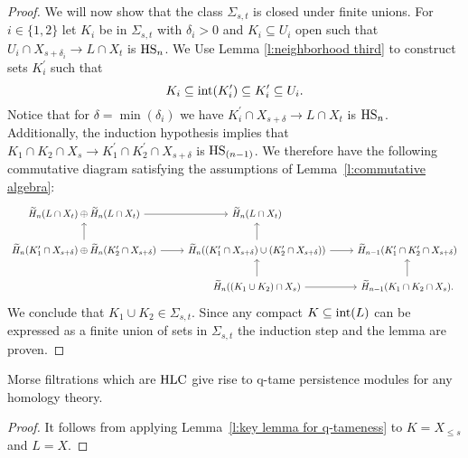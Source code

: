 \begin{proof}
	We will now show that the class $\Sigma_{s,t}$ is closed under finite unions.
	For $i \in \{1, 2\}$ let $K_i$ be in $\Sigma_{s,t}$ with $\delta_i > 0$ and $K_i \subseteq U_i$ open such that $U_{i} \cap X_{s+\delta_i} \to L \cap X_{t}$ is $\mathrm{HS}_n$.
	We Use Lemma \ref{l:neighborhood third} to construct sets $K_i^\prime$ such that
	\begin{equation*}
	K_i \subseteq \operatorname{int}(K_i^\prime) \subseteq K_i^\prime \subseteq U_i.
	\end{equation*}
	Notice that for $\delta = \min(\delta_i)$ we have $K_i^\prime \cap X_{s+\delta} \to L \cap X_t$ is $\mathrm{HS}_n$.
	Additionally, the induction hypothesis implies that $K_1 \cap K_2 \cap X_s \to K_1^\prime \cap K_2^\prime \cap X_{s+\delta}$ is $\mathrm{HS}_{(n-1)}$.
	We therefore have the following commutative diagram satisfying the assumptions of Lemma~\ref{l:commutative algebra}:
	\begin{equation*}
	\begin{tikzcd}
	\H_n(L \cap X_t) \oplus \H_n(L \cap X_t) \arrow[r] &
	\H_n(L \cap X_t) & \\
	\H_{n}(K_1^\prime \cap X_{s+\delta}) \oplus \H_n(K_2^\prime \cap X_{s+\delta}) \arrow[r] \arrow[u] & 
	\H_{n}((K_1^\prime \cap X_{s+\delta}) \cup (K_2^\prime \cap X_{s+\delta})) \arrow[r] \arrow[u] &
	\H_{n-1}(K_1^\prime \cap K_2^\prime \cap X_{s+\delta}) \\ & 
	\H_{n}((K_1 \cup K_2) \cap X_s) \arrow[r] \arrow[u] &
	\H_{n-1}(K_1 \cap K_2 \cap X_s). \arrow[u]
	\end{tikzcd}
	\end{equation*}
	We conclude that $K_1 \cup K_2 \in \Sigma_{s, t}$.
	Since any compact $K \subseteq \operatorname{int}(L)$ can be expressed as a finite union of sets in $\Sigma_{s,t}$ the induction step and the lemma are proven.
\end{proof}

\begin{thm} \label{t:strong local connectenss implies q-tameness}
	Morse filtrations which are $\mathrm{HLC}$ give rise to q-tame persistence modules for any homology theory.
\end{thm}

\begin{proof}
	It follows from applying Lemma~\ref{l:key lemma for q-tameness} to $K = X_{\leq s}$ and $L = X$.
\end{proof}

